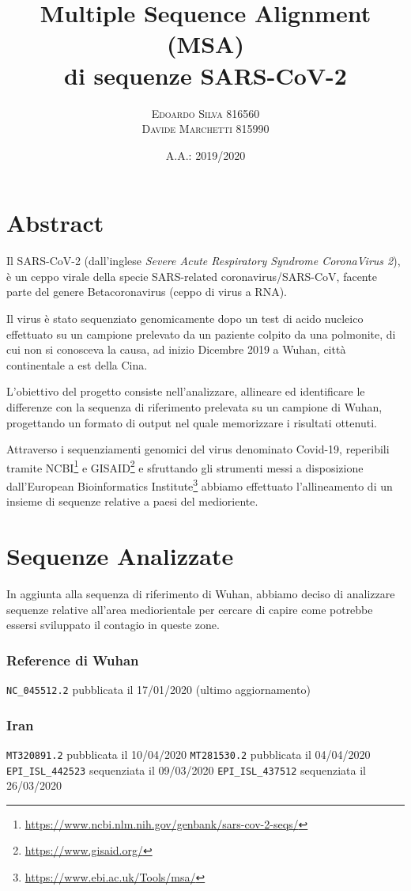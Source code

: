 \documentclass[11pt,italian]{article}
\title{Multiple Sequence Alignment (MSA) \\ di sequenze SARS-CoV-2}
\date{A.A.: 2019/2020}
\author{
    \textsc{Edoardo Silva} 816560 \\
    \textsc{Davide Marchetti} 815990
}
\makeatletter
\newcommand*{\lstitem}[1][]{%
  \setbox0\hbox\bgroup
    \patchcmd{\lst@InlineM}{\@empty}{\@empty\egroup\item[\usebox0]\leavevmode\ignorespaces}{}{}%
    \lstinline[#1]%
}
\makeatother
\begin{document}
\maketitle

\section*{Abstract}
Il SARS-CoV-2 (dall'inglese \textit{Severe Acute Respiratory Syndrome CoronaVirus 2}), è un ceppo virale della specie SARS-related coronavirus/SARS-CoV, facente parte del genere Betacoronavirus (ceppo di virus a RNA).

Il virus è stato sequenziato genomicamente dopo un test di acido nucleico effettuato su un campione prelevato da un paziente colpito da una polmonite, di cui non si conosceva la causa, ad inizio Dicembre 2019 a Wuhan, città continentale a est della Cina.

L'obiettivo del progetto consiste nell'analizzare, allineare ed identificare le differenze con la sequenza di riferimento prelevata su un campione di Wuhan, progettando un formato di output nel quale memorizzare i risultati ottenuti.

Attraverso i sequenziamenti genomici del virus denominato Covid-19, reperibili tramite NCBI\footnote{\url{https://www.ncbi.nlm.nih.gov/genbank/sars-cov-2-seqs/}} e GISAID\footnote{\url{https://www.gisaid.org/}} e sfruttando gli strumenti messi a disposizione dall'European Bioinformatics Institute\footnote{\url{https://www.ebi.ac.uk/Tools/msa/}} abbiamo effettuato l'allineamento di un insieme di sequenze relative a paesi del medioriente.

\newpage
\section{Sequenze Analizzate}
In aggiunta alla sequenza di riferimento di Wuhan, abbiamo deciso di analizzare sequenze relative all'area mediorientale per cercare di capire come potrebbe essersi sviluppato il contagio in queste zone.

\subsubsection*{Reference di Wuhan}
\begin{description}
    \lstitem{NC_045512.2} pubblicata il 17/01/2020 (ultimo aggiornamento)
\end{description}

\subsubsection*{Iran}
\begin{description}
    \lstitem{MT320891.2} pubblicata il 10/04/2020
    \lstitem{MT281530.2} pubblicata il 04/04/2020
    \lstitem{EPI_ISL_442523} sequenziata il 09/03/2020
    \lstitem{EPI_ISL_437512} sequenziata il 26/03/2020
\end{description}
\end{document}
